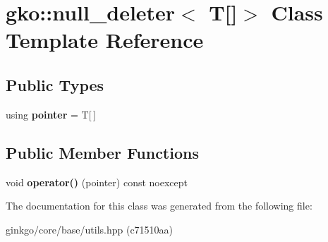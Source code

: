 \hypertarget{classgko_1_1null__deleter_3_01T[]_4}{}\section{gko\+:\+:null\+\_\+deleter$<$ T\mbox{[}\mbox{]}$>$ Class Template Reference}
\label{classgko_1_1null__deleter_3_01T[]_4}
\subsection*{Public Types}
\begin{DoxyCompactItemize}
\item 
\mbox{\label{classgko_1_1null__deleter_3_01T[]_4_a327915073992d00be1ff71150c2792b3}} 
using {\bfseries pointer} = T\mbox{[}$\,$\mbox{]}
\end{DoxyCompactItemize}
\subsection*{Public Member Functions}
\begin{DoxyCompactItemize}
\item 
\mbox{\label{classgko_1_1null__deleter_3_01T[]_4_abce6b34c72d1cb5984b1809787f73012}} 
void {\bfseries operator()} (pointer) const noexcept
\end{DoxyCompactItemize}


The documentation for this class was generated from the following file\+:\begin{DoxyCompactItemize}
\item 
ginkgo/core/base/utils.\+hpp (c71510aa)\end{DoxyCompactItemize}
